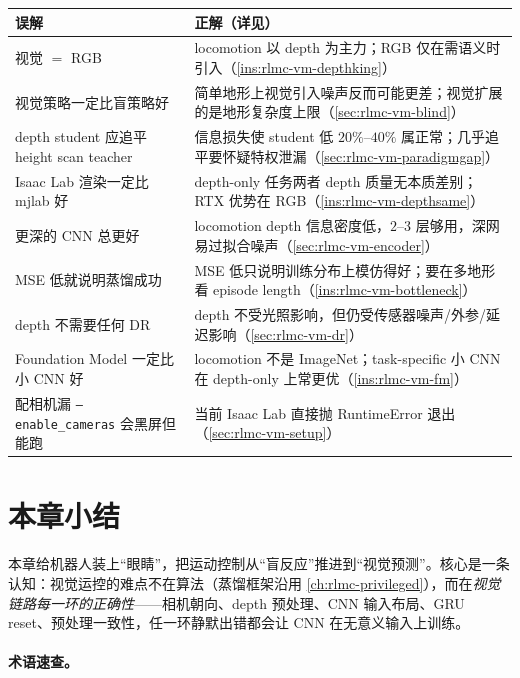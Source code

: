 \begin{center}
\small
\begin{tabular}{@{}p{5.2cm}p{6.4cm}@{}}
\toprule
误解 & 正解（详见） \\
\midrule
视觉 $=$ RGB & locomotion 以 depth 为主力；RGB 仅在需语义时引入（\cref{ins:rlmc-vm-depthking}） \\
视觉策略一定比盲策略好 & 简单地形上视觉引入噪声反而可能更差；视觉扩展的是地形复杂度上限（\cref{sec:rlmc-vm-blind}） \\
depth student 应追平 height scan teacher & 信息损失使 student 低 $20\%$--$40\%$ 属正常；几乎追平要怀疑特权泄漏（\cref{sec:rlmc-vm-paradigmgap}） \\
Isaac Lab 渲染一定比 mjlab 好 & depth-only 任务两者 depth 质量无本质差别；RTX 优势在 RGB（\cref{ins:rlmc-vm-depthsame}） \\
更深的 CNN 总更好 & locomotion depth 信息密度低，$2$--$3$ 层够用，深网易过拟合噪声（\cref{sec:rlmc-vm-encoder}） \\
MSE 低就说明蒸馏成功 & MSE 低只说明训练分布上模仿得好；要在多地形看 episode length（\cref{ins:rlmc-vm-bottleneck}） \\
depth 不需要任何 DR & depth 不受光照影响，但仍受传感器噪声/外参/延迟影响（\cref{sec:rlmc-vm-dr}） \\
Foundation Model 一定比小 CNN 好 & locomotion 不是 ImageNet；task-specific 小 CNN 在 depth-only 上常更优（\cref{ins:rlmc-vm-fm}） \\
配相机漏 \texttt{--enable\_cameras} 会黑屏但能跑 & 当前 Isaac Lab 直接抛 RuntimeError 退出（\cref{sec:rlmc-vm-setup}） \\
\bottomrule
\end{tabular}
\end{center}

\section{本章小结}
\label{sec:rlmc-vm-summary}

本章给机器人装上“眼睛”，把运动控制从“盲反应”推进到“视觉预测”。核心是一条认知：视觉运控的难点不在算法（蒸馏框架沿用 \cref{ch:rlmc-privileged}），而在\emph{视觉链路每一环的正确性}——相机朝向、depth 预处理、CNN 输入布局、GRU reset、预处理一致性，任一环静默出错都会让 CNN 在无意义输入上训练。

\paragraph{术语速查。}

